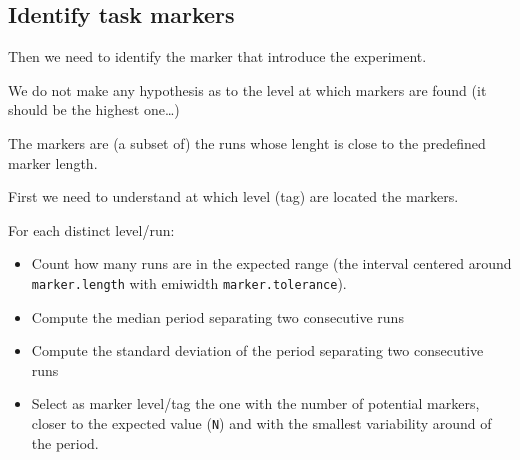 \documentclass[]{article}
\newenvironment{Shaded}{\begin{snugshade}}{\end{snugshade}}
\newcommand{\KeywordTok}[1]{\textcolor[rgb]{0.13,0.29,0.53}{\textbf{{#1}}}}
\newcommand{\DataTypeTok}[1]{\textcolor[rgb]{0.13,0.29,0.53}{{#1}}}
\newcommand{\DecValTok}[1]{\textcolor[rgb]{0.00,0.00,0.81}{{#1}}}
\newcommand{\StringTok}[1]{\textcolor[rgb]{0.31,0.60,0.02}{{#1}}}
\newcommand{\CommentTok}[1]{\textcolor[rgb]{0.56,0.35,0.01}{\textit{{#1}}}}
\newcommand{\NormalTok}[1]{{#1}}
\begin{document}
\subsection{Identify task markers}\label{identify-task-markers}

Then we need to identify the marker that introduce the experiment.

We do not make any hypothesis as to the level at which markers are found
(it should be the highest one\ldots{})

The markers are (a subset of) the runs whose lenght is close to the
predefined marker length.

First we need to understand at which level (tag) are located the
markers.

For each distinct level/run:

\begin{itemize}
\item
  Count how many runs are in the expected range (the interval centered
  around \texttt{marker.length} with emiwidth
  \texttt{marker.tolerance}).
\item
  Compute the median period separating two consecutive runs
\item
  Compute the standard deviation of the period separating two
  consecutive runs
\item
  Select as marker level/tag the one with the number of potential
  markers, closer to the expected value (\texttt{N}) and with the
  smallest variability around of the period.
\end{itemize}

\begin{Shaded}
\end{Shaded}
\end{document}
